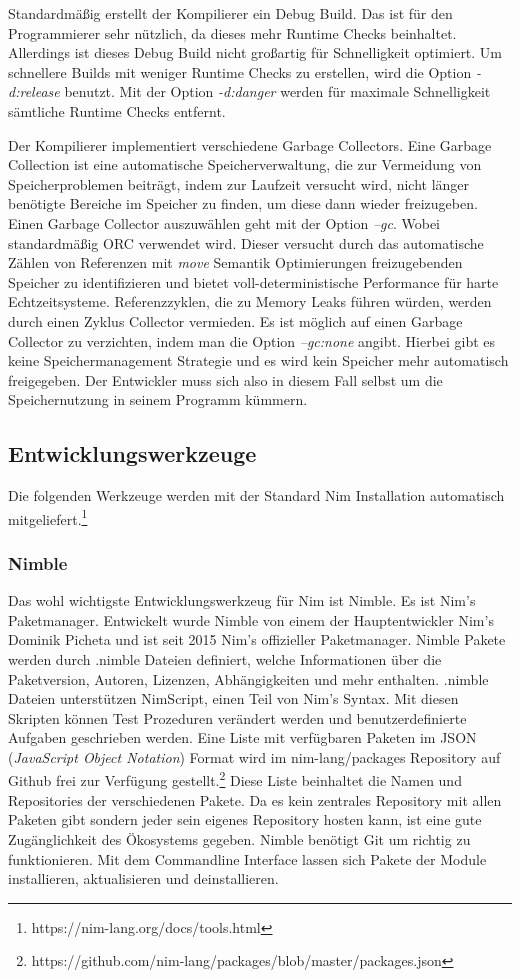 \documentclass[11pt]{report}
\begin{document}
Standardmäßig erstellt der Kompilierer ein Debug Build. Das ist für den Programmierer sehr nützlich, da dieses mehr Runtime Checks beinhaltet. Allerdings ist dieses Debug Build nicht großartig für Schnelligkeit optimiert. Um schnellere Builds mit weniger Runtime Checks zu erstellen, wird die Option \emph{-d:release} benutzt. Mit der Option \emph{-d:danger} werden für maximale Schnelligkeit sämtliche Runtime Checks entfernt.

Der Kompilierer implementiert verschiedene Garbage Collectors. Eine Garbage Collection ist eine automatische Speicherverwaltung, die zur Vermeidung von Speicherproblemen beiträgt, indem zur Laufzeit versucht wird, nicht länger benötigte Bereiche im Speicher zu finden, um diese dann wieder freizugeben.
Einen Garbage Collector auszuwählen geht mit der Option \emph{--gc}. Wobei standardmäßig ORC verwendet wird. Dieser versucht durch das automatische Zählen von Referenzen mit \emph{move} Semantik Optimierungen freizugebenden Speicher zu identifizieren und bietet voll-deterministische Performance für harte Echtzeitsysteme. Referenzzyklen, die zu Memory Leaks führen würden, werden durch einen Zyklus Collector vermieden.
Es ist möglich auf einen Garbage Collector zu verzichten, indem man die Option \emph{--gc:none} angibt. Hierbei gibt es keine Speichermanagement Strategie und es wird kein Speicher mehr automatisch freigegeben. Der Entwickler muss sich also in diesem Fall selbst um die Speichernutzung in seinem Programm kümmern.

\subsection{Entwicklungswerkzeuge}
Die folgenden Werkzeuge werden mit der Standard Nim Installation automatisch mitgeliefert.\footnote{https://nim-lang.org/docs/tools.html}

\subsubsection{Nimble}
Das wohl wichtigste Entwicklungswerkzeug für Nim ist Nimble. Es ist Nim's Paketmanager. Entwickelt wurde Nimble von einem der Hauptentwickler Nim's Dominik Picheta und ist seit 2015 Nim's offizieller Paketmanager. Nimble Pakete werden durch .nimble Dateien definiert, welche Informationen über die Paketversion, Autoren, Lizenzen, Abhängigkeiten und mehr enthalten.
.nimble Dateien unterstützen NimScript, einen Teil von Nim's Syntax. Mit diesen Skripten können Test Prozeduren verändert werden und benutzerdefinierte Aufgaben geschrieben werden.
Eine Liste mit verfügbaren Paketen im JSON (\emph{JavaScript Object Notation}) Format wird im nim-lang/packages Repository auf Github frei zur Verfügung gestellt.\footnote{https://github.com/nim-lang/packages/blob/master/packages.json} Diese Liste beinhaltet die Namen und Repositories der verschiedenen Pakete. Da es kein zentrales Repository mit allen Paketen gibt sondern jeder sein eigenes Repository hosten kann, ist eine gute Zugänglichkeit des Ökosystems gegeben.
Nimble benötigt Git um richtig zu funktionieren. Mit dem Commandline Interface lassen sich Pakete der Module installieren, aktualisieren und deinstallieren.
\end{document}
